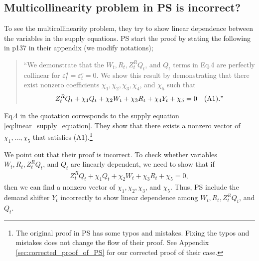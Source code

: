 \documentclass[11pt, a4paper]{article}
\begin{document}
\subsection{Multicollinearity problem in PS is incorrect?}
To see the multicollinearity problem, they try to show linear dependence between the variables in the supply equations. 
PS start the proof by stating the following in p137 in their appendix (we modify notations);
\begin{quote}
    ``We demonstrate that the $W_{t}, R_{t}, Z^{R}_{t}Q_{t}$, and $Q_{t}$ terms in Eq.4 are perfectly collinear for $\varepsilon_{t}^{d} = \varepsilon_{t}^{c} = 0$. We show this result by demonstrating that there exist nonzero coefficients $\chi_1,\chi_2,\chi_3,\chi_4$, and $\chi_5$ such that 
   \begin{align*}
    Z^{R}_{t} Q_{t} + \chi_1 Q_{t} + \chi_2 W_{t} + \chi_3 R_{t} + \chi_4 Y_{t} + \chi_5 = 0 \quad (\text{A1})."
    \end{align*}
\end{quote}
Eq.4 in the quotation corresponds to the supply equation \eqref{eq:linear_supply_equation}.
They show that there exists a nonzero vector of $\chi_1, \ldots, \chi_5$ that satisfies (A1).\footnote{The original proof in PS has some typos and mistakes. Fixing the typos and mistakes does not change the flow of their proof. See Appendix \ref{sec:corrected_proof_of_PS} for our corrected proof of their case.}

We point out that their proof is incorrect.
To check whether variables $W_{t}, R_{t}, Z^{R}_{t}Q_{t}$, and $Q_{t}$ are linearly dependent, we need to show that if
\begin{align}
    Z^{R}_{t} Q_{t} + \chi_1 Q_{t} + \chi_2 W_{t} + \chi_3 R_{t} + \chi_{5}  = 0, \label{eq:linear_independence}
\end{align}
then we can find a nonzero vector of $\chi_1, \chi_2,\chi_3$, and $\chi_5$.
Thus, PS include the demand shifter $Y_{t}$ incorrectly to show linear dependence among $W_{t}, R_{t}, Z^{R}_{t}Q_{t}$, and $Q_{t}$. 
\end{document}
